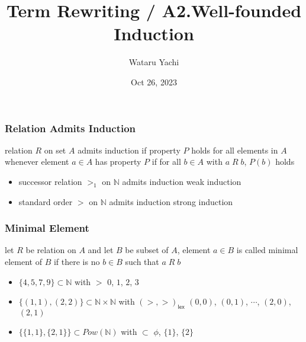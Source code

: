 \documentclass[12pt,aspectratio=169]{beamer}
\title{ Term Rewriting / A2.Well-founded Induction }
\author{Wataru Yachi}
\institute{JAIST}
\date{Oct 26, 2023}
\begin{document}
\maketitle



\begin{frame}
    \frametitle{Relation Admits Induction}
    \begin{definition}
        relation $R$ on set $A$ \alert{admits induction} if
        property $P$ holds for all elements in $A$ whenever
        element $a \in A$ has property $P$ if for all $b \in A$
        with $a \; R \; b$, $P(b)$ holds
    \end{definition}
    \pause
    \begin{example}
        \begin{itemize}
            \pause
            \item successor relation $>_1$ on $\mathbb{N}$ admits induction \pause \quad \alert{weak induction}
            \pause
            \item standard order $>$ on $\mathbb{N}$ admits induction \pause \quad \alert{strong induction}
        \end{itemize}
    \end{example}
\end{frame}

\begin{frame}
    \frametitle{Minimal Element}

    \begin{definition}
        let $R$ be relation on $A$ and let $B$ be subset of $A$,
        element $a \in B$ is called \alert{minimal} element of $B$
        if there is no $b \in B$ such that $a \; R \; b$
    \end{definition}
    \pause
    \begin{example}
        \begin{itemize}
            \pause
            \item $\{4,5,7,9\} \subset \mathbb{N}$ with $>$ \pause \quad \alert{$0$, $1$, $2$, $3$}
            \pause
            \item $\{(1,1), (2,2)\} \subset \mathbb{N} \times \mathbb{N}$ with $(>,>)_{\mathsf{lex}}$
                \pause \quad \alert{$(0,0)$, $(0,1)$, $\cdots$, $(2,0)$, $(2,1)$}
            \pause
            \item $\{ \{1,1\}, \{2,1\} \} \subset Pow(\mathbb{N})$ with $\subset$
                \pause \quad \alert{$\phi$, $\{1\}$, $\{2\}$}
        \end{itemize}
    \end{example}
\end{frame}
\end{document}

